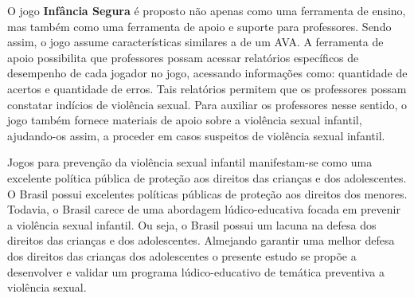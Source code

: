 O jogo \textbf{Infância Segura} é proposto não apenas como uma ferramenta de ensino, mas também como uma ferramenta de apoio e suporte para professores. Sendo assim, o jogo assume características similares a de um \ac{AVA}. A ferramenta de apoio possibilita que professores possam acessar relatórios específicos de desempenho de cada jogador no jogo, acessando informações como: quantidade de acertos e quantidade de erros. Tais relatórios permitem que os professores possam constatar indícios de violência sexual. Para auxiliar os professores nesse sentido, o jogo também fornece materiais de apoio sobre a violência sexual infantil, ajudando-os assim, a proceder em casos suspeitos de violência sexual infantil.


Jogos para prevenção da violência sexual infantil manifestam-se como uma excelente política pública de proteção aos direitos das crianças e dos adolescentes. O Brasil possui excelentes políticas públicas de proteção aos direitos dos menores. Todavia, o Brasil carece de uma abordagem lúdico-educativa focada em prevenir a violência sexual infantil. Ou seja, o Brasil possui um lacuna na defesa dos direitos das crianças e dos adolescentes. Almejando garantir uma melhor defesa dos direitos das crianças dos adolescentes o presente estudo se propõe a desenvolver e validar um programa lúdico-educativo de temática preventiva a violência sexual. 

